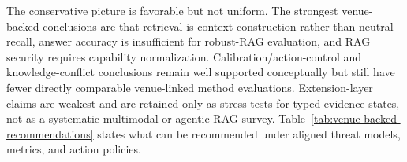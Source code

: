 \documentclass[11pt]{article}
\begin{document}


The conservative picture is favorable but not uniform. The strongest venue-backed conclusions are that retrieval is context construction rather than neutral recall, answer accuracy is insufficient for robust-RAG evaluation, and RAG security requires capability normalization. Calibration/action-control and knowledge-conflict conclusions remain well supported conceptually but still have fewer directly comparable venue-linked method evaluations. Extension-layer claims are weakest and are retained only as stress tests for typed evidence states, not as a systematic multimodal or agentic RAG survey. Table~\ref{tab:venue-backed-recommendations} states what can be recommended under aligned threat models, metrics, and action policies.
\end{document}
